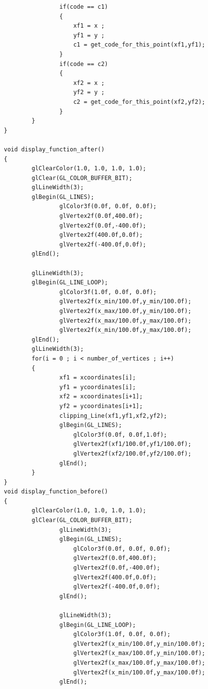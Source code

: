 \begin{itemize}
\begin{lstlisting}
                if(code == c1)
                {
                    xf1 = x ;
                    yf1 = y ;
                    c1 = get_code_for_this_point(xf1,yf1);
                }
                if(code == c2)
                {
                    xf2 = x ;
                    yf2 = y ;
                    c2 = get_code_for_this_point(xf2,yf2);
                }
        }
}

void display_function_after()
{
        glClearColor(1.0, 1.0, 1.0, 1.0);
        glClear(GL_COLOR_BUFFER_BIT);
        glLineWidth(3);
        glBegin(GL_LINES);
                glColor3f(0.0f, 0.0f, 0.0f);
                glVertex2f(0.0f,400.0f);
                glVertex2f(0.0f,-400.0f);
                glVertex2f(400.0f,0.0f);
                glVertex2f(-400.0f,0.0f);
        glEnd();

        glLineWidth(3);
        glBegin(GL_LINE_LOOP);
                glColor3f(1.0f, 0.0f, 0.0f);
                glVertex2f(x_min/100.0f,y_min/100.0f);
                glVertex2f(x_max/100.0f,y_min/100.0f);
                glVertex2f(x_max/100.0f,y_max/100.0f);
                glVertex2f(x_min/100.0f,y_max/100.0f);
        glEnd();
        glLineWidth(3);
        for(i = 0 ; i < number_of_vertices ; i++)
        {
                xf1 = xcoordinates[i];
                yf1 = ycoordinates[i];
                xf2 = xcoordinates[i+1];
                yf2 = ycoordinates[i+1];
                clipping_Line(xf1,yf1,xf2,yf2);
                glBegin(GL_LINES);
                    glColor3f(0.0f, 0.0f,1.0f);
                    glVertex2f(xf1/100.0f,yf1/100.0f);
                    glVertex2f(xf2/100.0f,yf2/100.0f);
                glEnd();
        }
}
void display_function_before()
{
        glClearColor(1.0, 1.0, 1.0, 1.0);
        glClear(GL_COLOR_BUFFER_BIT);
                glLineWidth(3);
                glBegin(GL_LINES);
                    glColor3f(0.0f, 0.0f, 0.0f);
                    glVertex2f(0.0f,400.0f);
                    glVertex2f(0.0f,-400.0f);
                    glVertex2f(400.0f,0.0f);
                    glVertex2f(-400.0f,0.0f);
                glEnd();

                glLineWidth(3);
                glBegin(GL_LINE_LOOP);
                    glColor3f(1.0f, 0.0f, 0.0f);
                    glVertex2f(x_min/100.0f,y_min/100.0f);
                    glVertex2f(x_max/100.0f,y_min/100.0f);
                    glVertex2f(x_max/100.0f,y_max/100.0f);
                    glVertex2f(x_min/100.0f,y_max/100.0f);
                glEnd();


\end{lstlisting}
\end{itemize}
